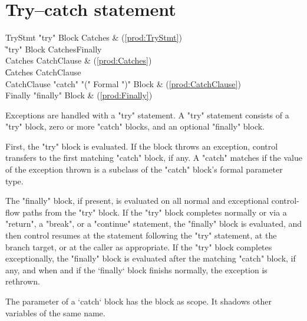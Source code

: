 \section{Try--catch statement}

\begin{bbgrammar}
             TryStmt \: \xcd"try" Block Catches & (\ref{prod:TryStmt}) \\
                     \| \xcd"try" Block Catches\opt Finally \\
             Catches \: CatchClause & (\ref{prod:Catches}) \\
                     \| Catches CatchClause \\
         CatchClause \: \xcd"catch" \xcd"(" Formal \xcd")" Block & (\ref{prod:CatchClause}) \\
             Finally \: \xcd"finally" Block & (\ref{prod:Finally}) \\
\end{bbgrammar}

Exceptions are handled with a \xcd"try" statement.
A \xcd"try" statement consists of a \xcd"try" block, zero or more
\xcd"catch" blocks, and an optional \xcd"finally" block.

First, the \xcd"try" block is evaluated.  If the block throws an
exception, control transfers to the first matching \xcd"catch"
block, if any.  A \xcd"catch" matches if the value of the
exception thrown is a subclass of the \xcd"catch" block's formal
parameter type.

The \xcd"finally" block, if present, is evaluated on all normal
and exceptional control-flow paths from the \xcd"try" block.
If the \xcd"try" block completes normally
or via a \xcd"return", a \xcd"break", or a
\xcd"continue" statement, 
the \xcd"finally"
block is evaluated, and then control resumes at
the statement following the \xcd"try" statement, at the branch target, or at
the caller as appropriate.
If the \xcd"try" block completes
exceptionally, the \xcd"finally" block is evaluated after the
matching \xcd"catch" block, if any, and when and if the \xcd`finally` block
finishs normally, the
exception is rethrown.


The parameter of a \xcd`catch` block has the block as scope.  It shadows other
variables of the same name.

